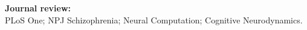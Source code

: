 

\textbf{Journal review:} \\
PLoS One; NPJ Schizophrenia; Neural Computation; Cognitive Neurodynamics.